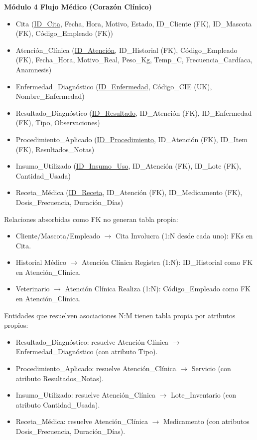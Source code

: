 \vspace{0.5cm}
\noindent \textbf{Módulo 4 Flujo Médico (Corazón Clínico)}

\begin{itemize}
	\item Cita (\underline{ID\_Cita}, Fecha, Hora, Motivo, Estado, ID\_Cliente (FK), ID\_Mascota (FK), Código\_Empleado (FK))
	\item Atención\_Clínica (\underline{ID\_Atención}, ID\_Historial (FK), Código\_Empleado (FK), Fecha\_Hora, Motivo\_Real, Peso\_Kg, Temp\_C, Frecuencia\_Cardíaca, Anamnesis)
	\item Enfermedad\_Diagnóstico (\underline{ID\_Enfermedad}, Código\_CIE (UK), Nombre\_Enfermedad)
	\item Resultado\_Diagnóstico (\underline{ID\_Resultado}, ID\_Atención (FK), ID\_Enfermedad (FK), Tipo, Observaciones)
	\item Procedimiento\_Aplicado (\underline{ID\_Procedimiento}, ID\_Atención (FK), ID\_Item (FK), Resultados\_Notas)
	\item Insumo\_Utilizado (\underline{ID\_Insumo\_Uso}, ID\_Atención (FK), ID\_Lote (FK), Cantidad\_Usada)
	\item Receta\_Médica (\underline{ID\_Receta}, ID\_Atención (FK), ID\_Medicamento (FK), Dosis\_Frecuencia, Duración\_Días)
\end{itemize}

Relaciones absorbidas como FK no generan tabla propia:
\begin{itemize}
	\item Cliente/Mascota/Empleado $\rightarrow$ Cita Involucra (1:N desde cada uno): FKs en Cita.
	\item Historial Médico $\rightarrow$ Atención Clínica Registra (1:N): ID\_Historial como FK en Atención\_Clínica.
	\item Veterinario $\rightarrow$ Atención Clínica Realiza (1:N): Código\_Empleado como FK en Atención\_Clínica.
\end{itemize}

Entidades que resuelven asociaciones N:M tienen tabla propia por atributos propios:
\begin{itemize}
	\item Resultado\_Diagnóstico: resuelve Atención Clínica $\rightarrow$ Enfermedad\_Diagnóstico (con atributo Tipo).
	\item Procedimiento\_Aplicado: resuelve Atención\_Clínica $\rightarrow$ Servicio (con atributo Resultados\_Notas).
	\item Insumo\_Utilizado: resuelve Atención\_Clínica $\rightarrow$ Lote\_Inventario (con atributo Cantidad\_Usada).
	\item Receta\_Médica: resuelve Atención\_Clínica $\rightarrow$ Medicamento (con atributos Dosis\_Frecuencia, Duración\_Días).
\end{itemize}

